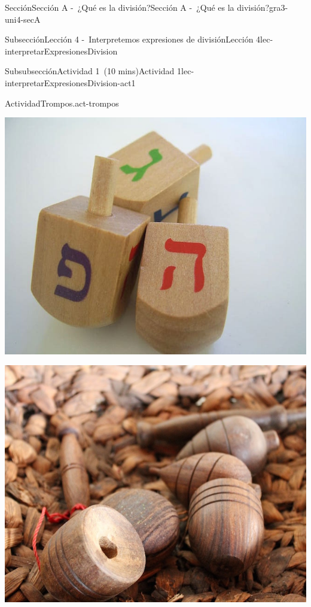 \documentclass[oneside,10pt,]{article}
\begin{document}
\begin{sectionptx}{Sección}{Sección A -~¿Qué es la división?}{}{Sección A -~¿Qué es la división?}{}{}{gra3-uni4-secA}
\begin{subsectionptx}{Subsección}{Lección 4 -~Interpretemos expresiones de división}{}{Lección 4}{}{}{lec-interpretarExpresionesDivision}
\begin{subsubsectionptx}{Subsubsección}{Actividad 1~(10 mins)}{}{Actividad 1}{}{}{lec-interpretarExpresionesDivision-act1}
\begin{activity}{Actividad}{Trompos.}{act-trompos}
\begin{sidebyside}{5}{0}{0}{0}
\begin{sbspanel}{0.2}
\includegraphics[width=\linewidth]{external/jpg-source/V1 3.4.A.4 Dreidels.jpg}
\end{sbspanel}%
\begin{sbspanel}{0.2}%
\includegraphics[width=\linewidth]{external/jpg-source/V1 3.4.A.4 Indonesian Gasing.jpg}
\end{sbspanel}%
\begin{sbspanel}{0.2}%

\end{sbspanel}
\end{sidebyside}
\end{activity}
\end{subsubsectionptx}
\end{subsectionptx}
\end{sectionptx}
\end{document}
